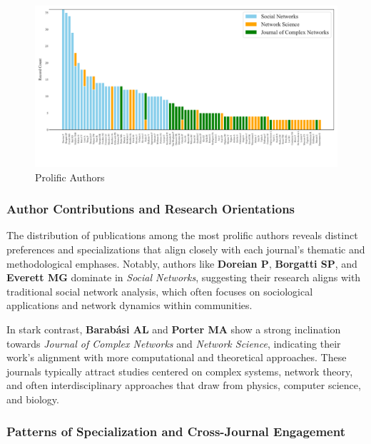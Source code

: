 \documentclass[twocolumn]{article}
\begin{document}
	\begin{figure}[htbp]
		\centering
		\includegraphics[width=\textwidth]{images/Top 30 Authors by Publication Count Across Three Journals.pdf}
		\caption{Prolific Authors}
		\label{fig.fig2}
	\end{figure}
	
	\subsubsection*{Author Contributions and Research Orientations}
	
	The distribution of publications among the most prolific authors reveals distinct preferences and specializations that align closely with each journal's thematic and methodological emphases. Notably, authors like \textbf{Doreian P}, \textbf{Borgatti SP}, and \textbf{Everett MG} dominate in \textit{Social Networks}, suggesting their research aligns with traditional social network analysis, which often focuses on sociological applications and network dynamics within communities.
	
	In stark contrast, \textbf{Barabási AL} and \textbf{Porter MA} show a strong inclination towards \textit{Journal of Complex Networks} and \textit{Network Science}, indicating their work's alignment with more computational and theoretical approaches. These journals typically attract studies centered on complex systems, network theory, and often interdisciplinary approaches that draw from physics, computer science, and biology.
	
	\subsubsection*{Patterns of Specialization and Cross-Journal Engagement}
	
\end{document}
